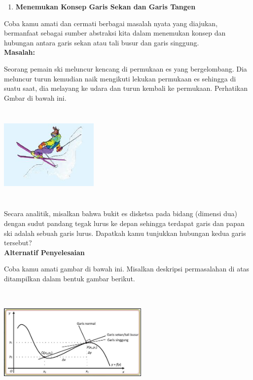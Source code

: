 \documentclass[11pt,fleqn]{book} %
\begin{document}
\noindent 
\begin{enumerate}
\item \textbf{Menemukan Konsep Garis Sekan dan Garis Tangen}
\end{enumerate}

\noindent 
Coba kamu amati dan cermati berbagai masalah nyata yang diajukan, bermanfaat sebagai sumber abstraksi kita dalam menemukan konsep dan hubungan antara garis sekan atau tali busur dan garis singgung.\\

\noindent 
\textbf{Masalah:}

\noindent 
Seorang pemain ski meluncur kencang di permukaan es yang bergelombang. Dia meluncur turun kemudian naik mengikuti lekukan permukaan es sehingga di suatu saat, dia melayang ke udara dan turun kembali ke permukaan. Perhatikan Gmbar di bawah ini.

\noindent
\begin{center}
\noindent \includegraphics*[width=1.90in, height=1.90in, keepaspectratio=false, trim=0.00in 0.11in 0.00in 0.00in]{Pictures/TurunanFungsi1.JPG}\\
\end{center}

\noindent 
Secara analitik, misalkan bahwa bukit es disketsa pada bidang (dimensi dua) dengan sudut pandang tegak lurus ke depan sehingga terdapat garis dan papan ski adalah sebuah garis lurus. Dapatkah kamu tunjukkan hubungan kedua garis tersebut?\\

\noindent 
\textbf{Alternatif Penyelesaian}

\noindent 
Coba kamu amati gambar di bawah ini. Misalkan deskripsi permasalahan di atas ditampilkan dalam bentuk gambar berikut. 

\noindent
\begin{center}
\noindent \includegraphics*[width=2.90in, height=2.19in, keepaspectratio=false, trim=0.00in 0.11in 0.00in 0.00in]{Pictures/TurunanFungsi2.JPG}
\end{center}
\end{document}
